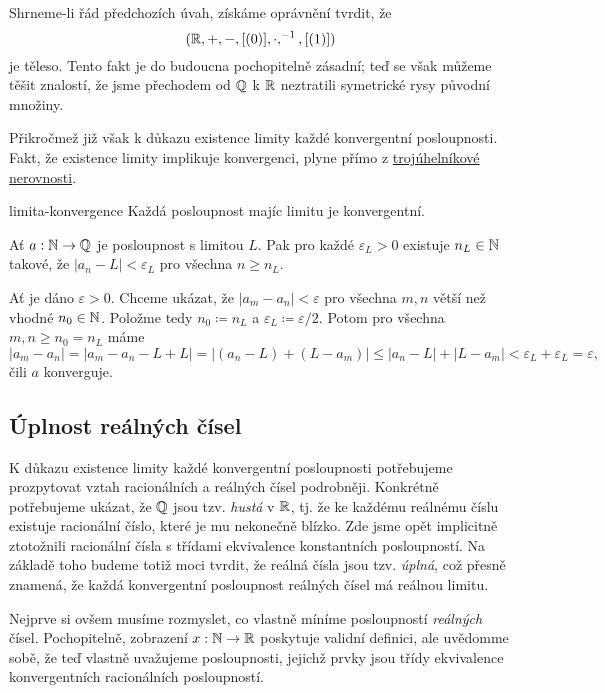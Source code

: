 Shrneme-li řád předchozích úvah, získáme oprávnění tvrdit, že
\[
 (\mathbb{R},+,-,[(0)], \cdot,^{-1},[(1)])
\]
je těleso. Tento fakt je do budoucna pochopitelně zásadní; teď se však můžeme
těšit znalostí, že jsme přechodem od $\mathbb{Q}$ k $\mathbb{R}$ neztratili symetrické rysy
původní množiny.

Přikročmež již však k důkazu existence limity každé konvergentní posloupnosti.
Fakt, že existence limity implikuje konvergenci, plyne přímo z
\hyperref[lem:trojuhelnikova-nerovnost]{trojúhelníkové nerovnosti}.

\begin{lemma}{}{limita-konvergence}
 Každá posloupnost majíc limitu je konvergentní.
\end{lemma}
\begin{lemproof}
 Ať $a:\mathbb{N} \to \mathbb{Q}$ je posloupnost s limitou $L$. Pak pro každé $\varepsilon_L>0$
 existuje $n_L \in \mathbb{N}$ takové, že $|a_n - L| < \varepsilon_L$ pro všechna $n
 \geq n_L$.

 Ať je dáno $\varepsilon>0$. Chceme ukázat, že $|a_m - a_n| < \varepsilon$ pro
 všechna $m,n$ větší než vhodné $n_0 \in \mathbb{N}$. Položme tedy $n_0 \coloneqq n_L$ a
 $\varepsilon_L \coloneqq \varepsilon / 2$. Potom pro všechna $m,n \geq n_0 =
 n_L$ máme
 \[
  |a_m - a_n| = |a_m - a_n - L + L| = |(a_n - L) + (L - a_m)| \leq |a_n - L| +
  |L - a_m| < \varepsilon_L + \varepsilon_L = \varepsilon,
 \]
 čili $a$ konverguje.
\end{lemproof}

\subsection{Úplnost reálných čísel}
\label{ssec:uplnost-realnych-cisel}

K důkazu existence limity každé konvergentní posloupnosti potřebujeme
prozpytovat vztah racionálních a reálných čísel podrobněji. Konkrétně
potřebujeme ukázat, že $\mathbb{Q}$ jsou tzv. \emph{hustá} v $\mathbb{R}$, tj. že ke každému
reálnému číslu existuje racionální číslo, které je mu nekonečně blízko. Zde jsme
opět implicitně ztotožnili racionální čísla s třídami ekvivalence konstantních
posloupností. Na základě toho budeme totiž moci tvrdit, že reálná čísla jsou
tzv. \emph{úplná}, což přesně znamená, že každá konvergentní posloupnost
reálných čísel má reálnou limitu.

Nejprve si ovšem musíme rozmyslet, co vlastně míníme posloupností
\emph{reálných} čísel. Pochopitelně, zobrazení $x:\mathbb{N} \to \mathbb{R}$ poskytuje validní
definici, ale uvědomme sobě, že teď vlastně uvažujeme posloupnosti, jejichž
prvky jsou třídy ekvivalence konvergentních racionálních posloupností.

